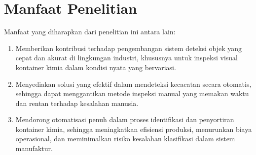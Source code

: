 \vspace{1em}

\section{Manfaat Penelitian}
Manfaat yang diharapkan dari penelitian ini antara lain:
\begin{enumerate}
  \item Memberikan kontribusi terhadap pengembangan sistem deteksi
    objek yang cepat dan akurat di lingkungan industri, khususnya
    untuk inspeksi visual kontainer kimia dalam kondisi nyata yang bervariasi.
  \item Menyediakan solusi yang efektif dalam mendeteksi kecacatan secara
    otomatis, sehingga dapat menggantikan metode inspeksi manual yang
    memakan waktu dan rentan terhadap kesalahan manusia.
  \item Mendorong otomatisasi penuh dalam proses identifikasi dan
    penyortiran kontainer kimia, sehingga meningkatkan efisiensi
    produksi, menurunkan biaya operasional, dan meminimalkan risiko
    kesalahan klasifikasi dalam sistem manufaktur.
\end{enumerate}
